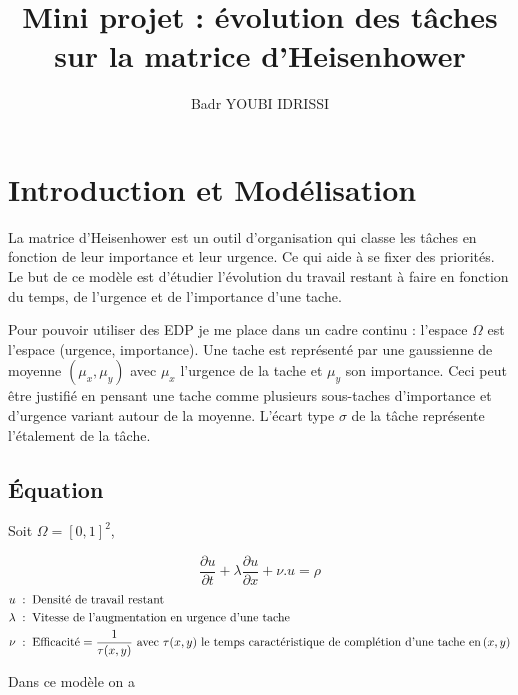 \documentclass[french]{article}
\author{Badr YOUBI IDRISSI}
\title{Mini projet : évolution des tâches sur la matrice d'Heisenhower}
\begin{document}
\maketitle
\section{Introduction et Modélisation}

    La matrice d'Heisenhower est un outil d'organisation qui classe les tâches en fonction de leur 
    importance et leur urgence. Ce qui aide à se fixer des priorités. Le but de ce modèle est d'étudier
    l'évolution du travail restant à faire en fonction du temps, de l'urgence et de l'importance d'une tache.
    
    Pour pouvoir utiliser des EDP je me place dans un cadre continu : l'espace $\Omega$ est l'espace (urgence, importance). Une tache est représenté par 
    une gaussienne de moyenne $(\mu_x,\mu_y)$ avec $\mu_x$ l'urgence de la tache et $\mu_y$ son importance.
    Ceci peut être justifié en pensant une tache comme plusieurs sous-taches d'importance et d'urgence variant
    autour de la moyenne. L'écart type $\sigma$ de la tâche représente l'étalement de la tâche.

    \subsection{\'Equation}
    Soit $\Omega = [0,1]^2$,
    
    \begin{equation}\label{EDP}
        \frac{\partial u}{\partial t} + \lambda\frac{\partial u}{\partial x} + \nu.u = \rho 
    \end{equation}
    \begin{alignat*}{6}
        u \;:\; &\text{\;Densité de travail restant} \\
        \lambda \;:\; &\text{\;Vitesse de l'augmentation en urgence d'une tache}\\
        \nu \;:\; &\text{\;Efficacité} = \frac{1}{\tau(x,y)} \text{ avec } \tau(x,y) \text{ le temps caractéristique de complétion d'une tache en} \,(x,y)
    \end{alignat*}
    
    Dans ce modèle on a
    
\end{document}
